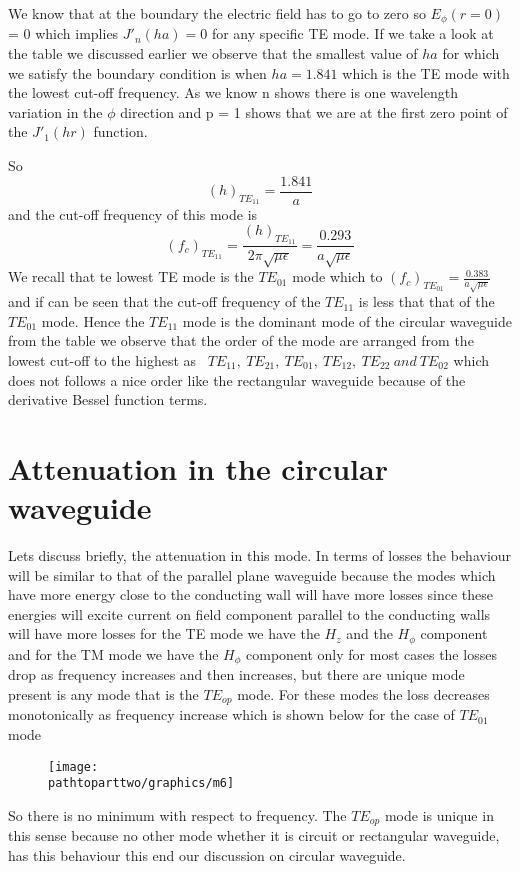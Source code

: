 We know that at the boundary the electric field has to go to zero so $E_\phi(r = 0)$ = 0 which implies $J'_n(ha) = 0$ for any specific TE mode. If we take a look at the table we discussed earlier we observe that the smallest value  of $ha$ for which we satisfy the boundary condition is when $ha= 1.841$ which is the TE mode with the lowest cut-off frequency. As we know n shows there is one wavelength variation in the $\phi$ direction and p = 1 shows that we are at  the first zero point of the $J'_1(hr)$ function.

So
$$(h)_{TE_{11}} = \frac{1.841}{a}$$
and the cut-off frequency of this mode is 
$$(f_c)_{TE_{11}} = \frac{(h)_{TE_{11}}}{2\pi\sqrt{\mu\epsilon}} = \frac{0.293}{a\sqrt{\mu\epsilon}}$$	
We recall that te lowest TE mode is the $TE_{01}$ mode which  to $(f_c)_{TE_{01}} = \frac{0.383}{a\sqrt{\mu\epsilon}}$ and if can be seen that the cut-off frequency of the $TE_{11}$ is less that that of the $TE_{01}$ mode. Hence the $TE_{11}$ mode is the dominant mode of the circular waveguide from the table we observe that the order of the mode are arranged from the lowest cut-off to the highest as \  $TE_{11}, \  TE_{21}, \ TE_{01}, \ TE_{12}, \ TE_{22} \ and \ TE_{02}$ which does not follows a nice order like the rectangular waveguide because of the derivative Bessel function terms.

\section{Attenuation in the circular waveguide}
 Lets discuss briefly, the attenuation in this mode. In terms of losses the behaviour will be similar to that of the parallel plane waveguide because the modes which have more energy close to the conducting wall will have more losses since these energies will excite current on field component parallel to the conducting walls will have more losses for the TE mode we have the $H_z$ and the $H_\phi$ component and for the TM mode we have the $H_\phi$ component only for most cases the losses drop as frequency increases and then increases, but there are unique mode present is any mode that is the $TE_{op}$ mode. For these modes the loss decreases monotonically as frequency increase which is shown below for the case of $TE_{01}$ mode 
\begin{figure}[h]
\centering
\texttt{[image: \\pathtoparttwo/graphics/m6]}
\caption{}
\label{fig:m6}
\end{figure}

So there is no minimum with respect to frequency. The $TE_{op}$ mode is unique in this sense because no other mode whether it is circuit or rectangular waveguide, has this behaviour this end our discussion on circular waveguide.
